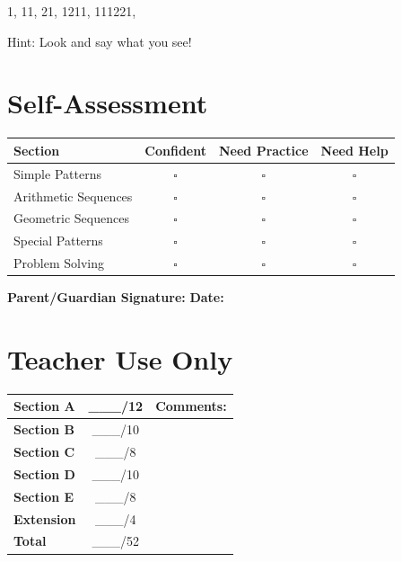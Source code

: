 \documentclass{article}
\begin{document}
1, 11, 21, 1211, 111221, \underline{\hspace{4cm}}

Hint: Look and say what you see!

\vspace{1cm}

\section*{Self-Assessment}
\begin{tabular}{|l|c|c|c|}
\hline
\textbf{Section} & \textbf{Confident} & \textbf{Need Practice} & \textbf{Need Help} \\
\hline
Simple Patterns & $\square$ & $\square$ & $\square$ \\
\hline
Arithmetic Sequences & $\square$ & $\square$ & $\square$ \\
\hline
Geometric Sequences & $\square$ & $\square$ & $\square$ \\
\hline
Special Patterns & $\square$ & $\square$ & $\square$ \\
\hline
Problem Solving & $\square$ & $\square$ & $\square$ \\
\hline
\end{tabular}

\vspace{0.5cm}

\textbf{Parent/Guardian Signature:} \underline{\hspace{5cm}} \textbf{Date:} \underline{\hspace{3cm}}

\section*{Teacher Use Only}
\begin{tabular}{|l|c|l|}
\hline
\textbf{Section A} & \_\_\_/12 & Comments: \\
\hline
\textbf{Section B} & \_\_\_/10 & \\
\hline
\textbf{Section C} & \_\_\_/8 & \\
\hline
\textbf{Section D} & \_\_\_/10 & \\
\hline
\textbf{Section E} & \_\_\_/8 & \\
\hline
\textbf{Extension} & \_\_\_/4 & \\
\hline
\textbf{Total} & \_\_\_/52 & \\
\hline
\end{tabular}
\end{document}
